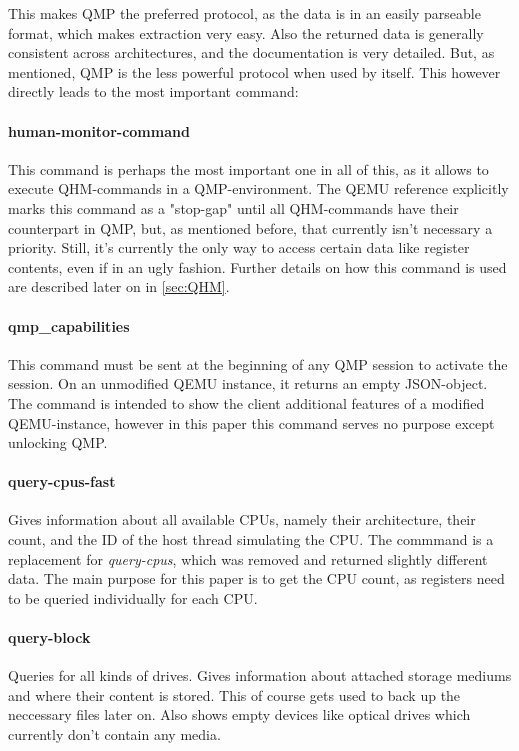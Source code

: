 This makes QMP the preferred protocol, as the data is in an easily parseable format, which makes extraction very easy.
Also the returned data is generally consistent across architectures, and the documentation is very detailed.
But, as mentioned, QMP is the less powerful protocol when used by itself.
This however directly leads to the most important command\cite{qmp-commands}:

\paragraph{human-monitor-command}
This command is perhaps the most important one in all of this, as it allows to execute QHM-commands in a QMP-environment.
The QEMU reference explicitly marks this command as a "stop-gap" until all QHM-commands have their counterpart in QMP,
but, as mentioned before, that currently isn't necessary a priority.
Still, it's currently the only way to access certain data like register contents, even if in an ugly fashion.
Further details on how this command is used are described later on in \autoref{sec:QHM}.

\paragraph{qmp_capabilities}
This command must be sent at the beginning of any QMP session to activate the session.
On an unmodified QEMU instance, it returns an empty JSON-object.
The command is intended to show the client additional features of a modified QEMU-instance,
however in this paper this command serves no purpose except unlocking QMP.

\paragraph{query-cpus-fast}
Gives information about all available CPUs, namely their architecture,
their count, and the ID of the host thread simulating the CPU.
The commmand is a replacement for \emph{query-cpus}, which was removed and returned slightly different data.
The main purpose for this paper is to get the CPU count, as registers need to be queried individually for each CPU.

\paragraph{query-block}
Queries for all kinds of drives. Gives information about attached storage mediums and where their content is stored.
This of course gets used to back up the neccessary files later on.
Also shows empty devices like optical drives which currently don't contain any media.